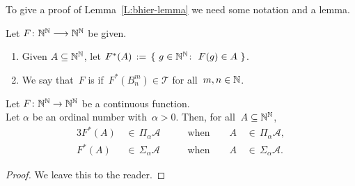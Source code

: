\documentclass[main.tex]{subfiles}
\begin{document}
To give a proof of Lemma~\ref{L:bhier-lemma}
we need some notation and a lemma.
\begin{dfn}
\label{D:bhier-continuous}
Let $F\colon \mathbb{N}^{\mathbb{N}}\longrightarrow \mathbb{N}^{\mathbb{N}}$
be given.
\begin{enumerate}
\item
Given $A\subseteq \mathbb{N}^{\mathbb{N}}$,
let
$F^*(A)\,:=\,\{\ g\in \mathbb{N}^{\mathbb{N}}\colon \ F(g)\in A\ \}$.
\item
We say that~$F$ is 
if~$F^*(B^m_n) \in \mathcal{T}$
for all~$m,n\in \mathbb{N}$.
\end{enumerate}
\end{dfn}
\begin{lem}
\label{L:bhier-continuous}
Let $F\colon \mathbb{N}^{\mathbb{N}}\rightarrow \mathbb{N}^{\mathbb{N}}$ be a continuous function.\\
Let $\alpha$ be an ordinal number with~$\alpha>0$.
Then, for all~$A\subseteq\mathbb{N}^{\mathbb{N}}$,
\begin{alignat*}{3}
F^*(A) \,&\in\, \Pi_\alpha\mathcal{A}&
\qquad\text{when}\qquad A\,&\in\,\Pi_\alpha\mathcal{A}, \\
F^*(A) \,&\in\, \Sigma_\alpha\mathcal{A}&
\qquad\text{when}\qquad A\,&\in\,\Sigma_\alpha\mathcal{A}.
\end{alignat*}
\end{lem}
\begin{proof}
We leave this to the reader.
\end{proof}
\end{document}
